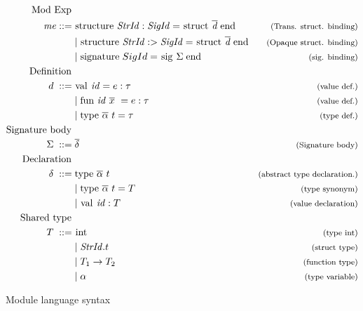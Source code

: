 \begin{figure}[!htb]
\begin{align*}
\begin{aligned}
%
\text{Mod Exp }\\
\mathit{me} ::= \; & \text{\lsttext{structure}} \;  \mathit{StrId : SigId} = \text{\lsttext{struct}}\; \overline{\mathit{d}}\; \text{\lsttext{end}}
                                             & \expl{(Trans. struct. binding)}\\
&|\; \text{\lsttext{structure}} \;  \mathit{StrId :> SigId} = 
\text{\lsttext{struct}}\; \overline{\mathit{d}}\; \text{\lsttext{end}}
                                             & \expl{(Opaque struct. binding)}\\
&|\; \text{\lsttext{signature}} \; SigId = 
\text{\lsttext{sig}}\; \Sigma \; \text{\lsttext{end}} 
                                             & \expl{(sig. binding)}\\
%
\text{Definition }\\
d \; ::= \; &\text{\lsttext{val}}\ \mathit{id}=e:\tau   & \expl{(value def.)} \\
& |\; \text{\lsttext{fun}}\  \mathit{id}\ \overline{x}\ =e:\tau   & \expl{(value def.)} \\
& |\; \text{\lsttext{type}}\ \ova\ t= \tau           & \expl{(type def.)} \\
%
\text{Signature body } \\
\Sigma \; ::= \; &\overline{\delta}                    & \expl{(Signature body)}\\
%
\text{Declaration }\\
\delta \; ::= \; & \text{\lsttext{type}}\ \ova\ t  & \expl{(abstract type declaration.)} \\
& | \; \text{\lsttext{type}}\ \ova\ t = T          & \expl{(type synonym)} \\
& | \; \text{\lsttext{val}}\ \mathit{id}:T         & \expl{(value declaration)} \\
%
\text{Shared type } \\
T \; ::= \; &\text{\lsttext{int}}                  & \expl{(type int)} \\
&| \; \mathit{StrId}.t                             & \expl{(struct type)}\\
&| \; T_{1} \rightarrow T_{2}                      & \expl{(function type)}\\
&| \; \alpha                                       & \expl{(type variable)}
\end{aligned}
\end{align*}
\caption{Module language syntax \label{fig:ModuleSyntax}}
\label{fig:Syntax}
\end{figure}
